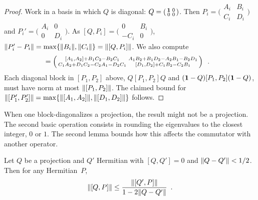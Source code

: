\documentclass[preprintnumbers,11pt,onecolumn]{article}
\begin{document}
\begin{proof}
Work in a basis in which $Q$ is diagonal: $Q = \left(\begin{smallmatrix}\boldsymbol{1} & 0\\0 & 0\end{smallmatrix}\right)$.  Then $P_i = \big(\begin{smallmatrix}A_i & B_i \\ C_i & D_i\end{smallmatrix}\big)$ and $P_i' = \big(\begin{smallmatrix}A_i & 0 \\ 0 & D_i\end{smallmatrix}\big)$.  As $[Q, P_i] = \big(\begin{smallmatrix}0 & B_i \\ -C_i & 0\end{smallmatrix}\big)$, ${\| P_i' - P_i \|} = \max\{ {\| B_i \|}, {\| C_i \|} \} = {\| [Q, P_i] \|}$.  We also compute 
\begin{align*}
[P_1, P_2] &= \fastmatrix{
[A_1, A_2] + B_1 C_2 - B_2 C_1
& A_1 B_2 + B_1 D_2 - A_2 B_1 - B_2 D_1 \\
C_1 A_2 + D_1 C_2 - C_2 A_1 - D_2 C_1 
& [D_1, D_2] + C_1 B_2 - C_2 B_1
}
 \enspace .
\end{align*}
Each diagonal block in $[P_1, P_2]$ above, $Q [P_1, P_2] Q$ and $(\boldsymbol{1} - Q) [P_1, P_2] (\boldsymbol{1} - Q)$, must have norm at most ${\| [P_1, P_2] \|}$.  The claimed bound for ${\| [P_1', P_2'] \|} = \max\{ {\| [A_1, A_2] \|}, {\| [D_1, D_2] \|} \}$ follows.  
\end{proof}

When one block-diagonalizes a projection, the result might not be a projection.  The second basic operation consists in rounding the eigenvalues to the closest integer, $0$ or $1$.  The second lemma bounds how this affects the commutator with another operator.  

\begin{lemma} \label{t:perturbedcommutator}
Let $Q$ be a projection and $Q'$ Hermitian with $[Q, Q'] = 0$ and ${\| Q - Q' \|} < 1/2$.  Then for any Hermitian~$P$, 
\begin{equation*}
{\| [Q, P] \|} \leq \frac{{\| [Q', P] \|}}{1 - 2 {\| Q - Q' \|}}
 \enspace .
\end{equation*}
\end{lemma}
\end{document}
